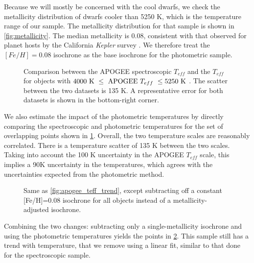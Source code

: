 \documentclass[manuscript]{aastex6}
\newcommand{\Kepler}{\mbox{\textit{Kepler}}}
\newcommand{\Teff}{\ensuremath{T_{eff}}}
\begin{document}
Because we will mostly be concerned with the cool dwarfs, we check the
metallicity distribution of dwarfs cooler than 5250 K, which is the 
temperature range of our sample. The metallicity distribution for that
sample is shown in \cref{fig:metallicity}. The median metallicity is 
0.08, consistent with that observed for planet hosts by 
the California \Kepler{} survey \citep{Petigura17}.  We therefore treat the \([Fe/H] =
0.08\) isochrone as the base isochrone for the photometric sample.

\begin{figure}[htb]
    \centering
    \caption{Comparison between the APOGEE spectroscopic \Teff{} and the
        \citet{Pinsonneault12} \Teff{} for objects with \(4000 \textrm{ K } \le
    \textrm{ APOGEE \Teff{} } \le 5250 \textrm{ K }\). The scatter between the
two datasets is 135 K. A representative error for both datasets is shown in the
bottom-right corner.}\label{fig:teffdiff}
\end{figure}

We also estimate the impact of the photometric temperatures by directly 
comparing the spectroscopic and photometric temperatures for the set of 
overlapping points shown in \cref{fig:teffdiff}. Overall, the two temperature scales are reasonably
correlated. There is a temperature scatter of 135 K between the two scales.
Taking into account the 100 K uncertainty in the APOGEE \Teff{} scale, this
implies a 90K uncertainty in the \citet{Pinsonneault12} temperatures, which
agrees with the uncertainties expected from the photometric method. 

\begin{figure}[htb]
    \centering
    \caption{Same as \cref{fig:apogee_teff_trend}, except subtracting off a
    constant [Fe/H]=0.08 isochrone for all objects instead of a 
    metallicity-adjusted isochrone.}\label{fig:photuncor}
\end{figure}

Combining the two changes: subtracting only a single-metallicity isochrone and
using the photometric temperatures yields the points in \cref{fig:photuncor}.
This sample still has a trend with temperature, that we remove using a linear
fit, similar to that done for the spectroscopic sample.
\end{document}
